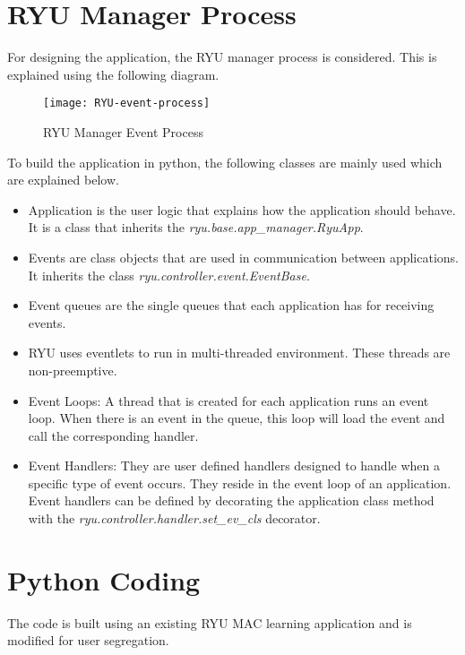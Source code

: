 \section{RYU Manager Process \cite{RYU_app_process}} \label{RYU_Manager_Process}
 For designing the application, the RYU manager process is considered. This is explained using the following diagram.
 \begin{figure}[H]
 	\centering
 	\texttt{[image: RYU-event-process]}
 	\caption {RYU Manager Event Process \cite{RYU_event_process_diag}}
 	\label{fig:RYU-Event-Process}
 	\vspace{-10pt}
 \end{figure}
To build the application in python, the following classes are mainly used which are explained below.

\begin{itemize}
	\item Application is the user logic that explains how the application should behave. It is a class that inherits the \textit{ryu.base.app\_manager.RyuApp}.
	\item Events are class objects that are used in communication between applications. It inherits the class \textit{ryu.controller.event.EventBase}.
	\item Event queues are the single queues that each application has for receiving events.
	\item RYU uses eventlets to run in multi-threaded environment. These threads are non-preemptive.
	\item Event Loops: A thread that is created for each application runs an event loop. When there is an event in the queue, this loop will load the event and call the corresponding handler.
	\item Event Handlers:  They are user defined handlers designed to handle when a specific type of event occurs. They reside in the event loop of an application. Event handlers can be defined by decorating the application class method with the \textit{ryu.controller.handler.set\_ev\_cls} decorator.
	
\end{itemize}

\section{Python Coding}\label{Python_code}
The code is built using an existing RYU MAC learning application and is modified for user segregation.

